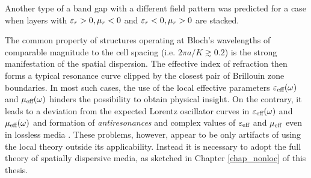 Another type of a band gap with a different field pattern was predicted \cite{wang2004omnidirectional} for a case when layers with $\varepsilon_r>0, \mu_r<0$ and $\varepsilon_r<0, \mu_r>0$  are stacked. %

%	
%

The common property of structures operating at Bloch's wavelengths of comparable magnitude to the cell spacing (i.e. $2\pi a/K \gtrsim 0.2$) is the strong manifestation of the spatial dispersion. The effective index of refraction then forms a typical resonance curve clipped by the closest pair of Brillouin zone boundaries. In most such cases, the use of the local effective parameters $\varepsilon_{\text{eff} }(\omega)$ and $\mu_{\text{eff} }(\omega)$ hinders the possibility to obtain physical insight. On the contrary, it leads to a deviation from the expected Lorentz oscillator curves in $\varepsilon_{\text{eff} }(\omega)$ and $\mu_{\text{eff} }(\omega)$ and formation of \textit{antiresonances} \cite{koschny2003resonant,wallen2011anti} and complex values of $\varepsilon_{\text{eff} }$ and $\mu_{\text{eff} }$ even in lossless media \cite{li2003photonic}. These problems, however, appear to be only artifacts of using the local theory outside its applicability. Instead it is necessary to adopt the full theory of spatially dispersive media, as sketched in Chapter \ref{chap_nonloc} of this thesis.

